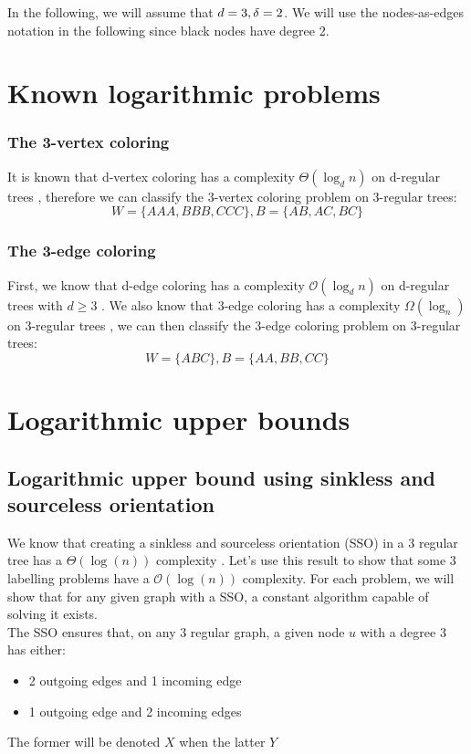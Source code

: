 In the following, we will assume that $d = 3, \delta = 2$. We will use the nodes-as-edges notation in the following since black nodes have degree 2.

\section{Known logarithmic problems}\label{sec:known}
\subsubsection{The 3-vertex coloring}
It is known that d-vertex coloring has a complexity $\Theta(\log_dn)$ on d-regular trees \cite{DBLP:journals/corr/ChangKP16}, therefore we can classify the 3-vertex coloring problem on 3-regular trees: $$W = \{AAA,BBB,CCC\}, B =\{AB,AC,BC\}$$

\subsubsection{The 3-edge coloring}
First, we know that d-edge coloring has a complexity $\mathcal{O}(\log_dn)$  on d-regular trees with $d\geq 3$ \cite{DBLP:journals/corr/abs-1708-04290}.
We also know that 3-edge coloring has a complexity $\Omega(\log_n)$ on 3-regular trees \cite{balliu2019locality}, we can then classify the 3-edge coloring problem on 3-regular trees: $$W = \{ABC\}, B=\{AA,BB,CC\}$$

\section{Logarithmic upper bounds}
\subsection{Logarithmic upper bound using sinkless and sourceless orientation}
We know that creating a sinkless and sourceless orientation (SSO) in a 3 regular tree has a $\Theta(\log(n))$ complexity \cite{1}. Let's use this result to show that some 3 labelling problems have a $\mathcal{O}(\log(n))$ complexity. For each problem, we will show that for any given graph with a SSO, a constant algorithm capable of solving it exists.\\
The SSO ensures that, on any 3 regular graph, a given node $u$ with a degree 3 has either:
\begin{itemize}
    \item 2 outgoing edges and 1 incoming edge
    \item 1 outgoing edge and 2 incoming edges
\end{itemize}
The former will be denoted $X$ when the latter $Y$

